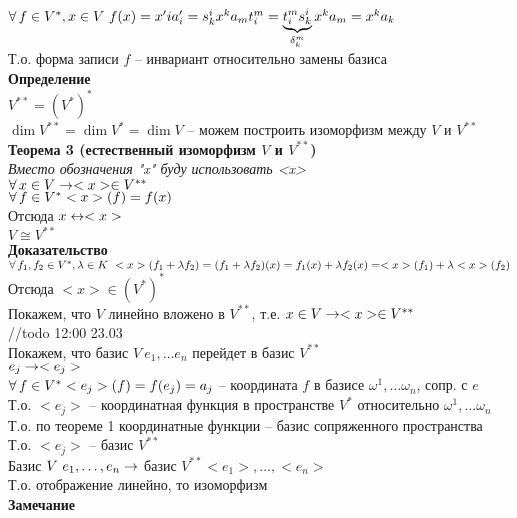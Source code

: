 \documentclass[12pt]{article}
\begin{document}
$\fall f \in V^*, x\in V\ f(x) = x'ia'_i = s^i_k x^k a_m t^m_i = \ub{\delta^m_k}{t^m_i s^i_k} x^k a_m = x^ka_k$\\
Т.о. форма записи $f$ -- инвариант относительно замены базиса\\
\textbf{Определение}\\
$V^{**} = (V^*)^*$\\
$\dim V^{**} = \dim V^* = \dim V$ -- можем построить изоморфизм между $V$ и $V^{**}$\\
\textbf{Теорема 3 (естественный изоморфизм $V$ и $V^{**}$)}\\
\textit{Вместо обозначения "x" буду использовать <x>}\\
$\fall x \in V \rto <x>\in V^{**}$\\
$\fall f \in V^* <x>(f)=f(x)$\\
Отсюда $x \lrto <x>$\\
$V\cong V^{**}$\\
\textbf{Доказательство}\\
$\fall f_1, f_2 \in V^*, \lambda \in K\ <x>(f_1+\lambda f_2) = (f_1 + \lambda f_2)(x) = f_1(x) + \lambda f_2(x) = <x>(f_1) + \lambda <x>(f_2)$\\
Отсюда $<x> \in (V^*)^*$\\
Покажем, что $V$ линейно вложено в $V^{**}$, т.е. $x \in V \rto <x> \in V^{**}$\\
//todo 12:00 23.03\\
Покажем, что базис $V\ e_1, \ldots e_n$ перейдет в базис $V^{**}$\\
$e_j \rto <e_j>$\\
$\fall f\in V^* <e_j>(f) = f(e_j) = a_j$ -- координата $f$ в базисе $\omega^1, \ldots \omega_n$, сопр. с $e$\\
Т.о. $<e_j>$ -- координатная функция в пространстве $V^*$ относительно $\omega^1, \ldots \omega_n$\\
Т.о. по теореме 1 координатные функции -- базис сопряженного пространства\\
Т.о. $<e_j>$ -- базис $V^{**}$\\
Базис $V\ e_1,\ldots, e_n \rto$ базис $V^{**} <e_1>, \ldots, <e_n>$\\
Т.о. отображение линейно, то изоморфизм\\
\textbf{Замечание}
\end{document}
